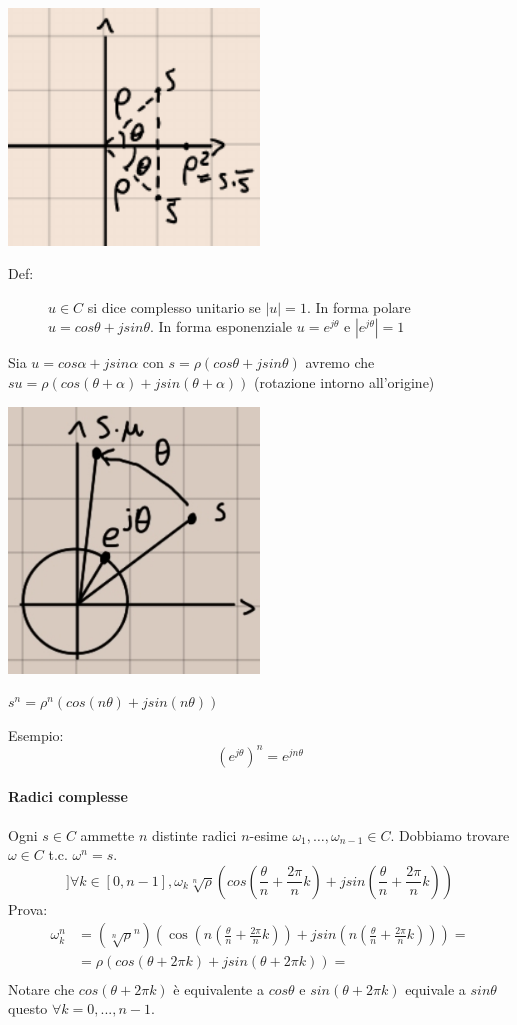 \documentclass[a4paper, 12pt]{book}
\theoremstyle{plain}
\begin{document}
\begin{center}
    \includegraphics[width=0.5\textwidth]{num_comp9.png}
\end{center}
\begin{description}
    \item[Def: ]$u\in C$ si dice complesso unitario se $|u|=1$. In forma polare $u=cos\theta+jsin\theta$. In forma esponenziale
     $u=e^{j\theta}$ e $|e^{j\theta}|=1$  
\end{description}
Sia $u=cos\alpha+jsin\alpha$ con $s=\rho(cos\theta+jsin\theta)$ avremo che $su=\rho(cos(\theta+\alpha)+jsin(\theta+\alpha))$
(rotazione intorno all'origine)
\begin{center}
    \includegraphics[width=0.5\textwidth]{num_comp10.jpg}
\end{center}
$s^n=\rho^n(cos(n\theta)+jsin(n\theta))$

Esempio: \[(e^{j\theta})^n=e^{jn\theta}\]
\paragraph{Radici complesse}

Ogni $s\in C$ ammette $n$ distinte radici $n$-esime $\omega_1,\dots,\omega_{n-1} \in C$.
Dobbiamo trovare $\omega \in C$ t.c. $\omega^n=s$.
\[]\forall k \in [0, n-1], \omega_k\sqrt[n]{\rho}(cos(\frac{\theta}{n}+\frac{2\pi}{n}k)
+jsin(\frac{\theta}{n}+\frac{2\pi}{n}k))
\]
Prova: 
\[
\begin{split}
\omega_k^n &= (\sqrt[n]{\rho}^n)(\cos(n(\frac{\theta}{n}+\frac{2\pi}{n}k))+jsin(n(\frac{\theta}{n}+\frac{2\pi}{n}k))) = \\
 &= \rho(cos(\theta+2\pi k)+jsin(\theta+2\pi k))= \\
\end{split}
\]
Notare che $cos(\theta+2\pi k)$ è equivalente a $cos\theta$ e $sin(\theta+2\pi k)$ equivale a $sin\theta$ questo
$\forall k=0,...,n-1$.
\end{document}
